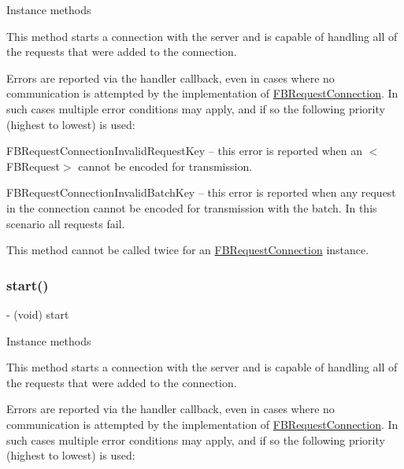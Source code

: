 Instance methods

This method starts a connection with the server and is capable of handling all of the requests that were added to the connection.

Errors are reported via the handler callback, even in cases where no communication is attempted by the implementation of {\ttfamily \hyperlink{interfaceFBRequestConnection}{F\+B\+Request\+Connection}}. In such cases multiple error conditions may apply, and if so the following priority (highest to lowest) is used\+:


\begin{DoxyItemize}
\item {\ttfamily F\+B\+Request\+Connection\+Invalid\+Request\+Key} -- this error is reported when an $<$\+F\+B\+Request$>$ cannot be encoded for transmission.
\item {\ttfamily F\+B\+Request\+Connection\+Invalid\+Batch\+Key} -- this error is reported when any request in the connection cannot be encoded for transmission with the batch. In this scenario all requests fail.
\end{DoxyItemize}

This method cannot be called twice for an {\ttfamily \hyperlink{interfaceFBRequestConnection}{F\+B\+Request\+Connection}} instance. \mbox{\label{interfaceFBRequestConnection_a8ddb3ae0c9915b148492678fdbc66a6c}} 
\subsubsection{\texorpdfstring{start()}{start()}\hspace{0.1cm}{\footnotesize\ttfamily [4/5]}}
{\footnotesize\ttfamily -\/ (void) start \begin{DoxyParamCaption}{ }\end{DoxyParamCaption}}

Instance methods

This method starts a connection with the server and is capable of handling all of the requests that were added to the connection.

Errors are reported via the handler callback, even in cases where no communication is attempted by the implementation of {\ttfamily \hyperlink{interfaceFBRequestConnection}{F\+B\+Request\+Connection}}. In such cases multiple error conditions may apply, and if so the following priority (highest to lowest) is used\+:


